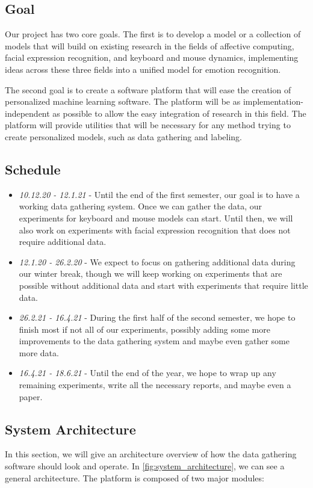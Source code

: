 \documentclass[../main.tex]{subfiles}
\begin{document}
\subsection{Goal}
Our project has two core goals. The first is to develop a model or a collection of models that will build on existing research in
the fields of affective computing, facial expression recognition, and keyboard and mouse dynamics, implementing ideas across these
three fields into a unified model for emotion recognition.

The second goal is to create a software platform that will ease the creation of personalized machine learning software.
The platform will be as implementation-independent as possible to allow the easy integration of research in this field.
The platform will provide utilities that will be necessary for any method trying to create personalized models,
such as data gathering and labeling.


\subsection{Schedule}

\begin{itemize}
    \item \emph{10.12.20 - 12.1.21} - Until the end of the first semester, our goal is to have a working data gathering system.
        Once we can gather the data, our experiments for keyboard and mouse models can start. Until then,
        we will also work on experiments with facial expression recognition that does not require additional data. 
    \item \emph{12.1.20 - 26.2.20} - We expect to focus on gathering additional data during our winter break,
        though we will keep working on experiments that are possible without additional data and start with experiments that require
        little data.
    \item \emph{26.2.21 - 16.4.21} - During the first half of the second semester, we hope to finish most if not all of our experiments,
        possibly adding some more improvements to the data gathering system and maybe even gather some more data. 
    \item \emph{16.4.21 - 18.6.21} - Until the end of the year, we hope to wrap up any remaining experiments, write all the necessary reports,
        and maybe even a paper.
\end{itemize}

\subsection{System Architecture}
In this section, we will give an architecture overview of how the data gathering software should look and operate.
In \ref{fig:system_architecture}, we can see a general architecture. The platform is composed of two major modules:
\end{document}
